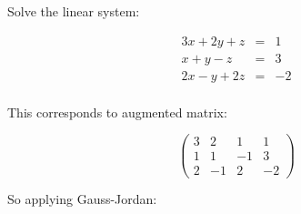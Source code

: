 \begin{example}\label{Example:GaussJordan}
Solve the linear system:

\begin{eqnarray*}
3x+2y+z&=&1\\
x+y-z&=&3\\
2x-y+2z&=&-2\\
\end{eqnarray*}

This corresponds to augmented matrix:


$$\left( \begin{array}{rrr|r}
3 & 2 & 1 & 1\\
1 & 1  & -1 & 3\\
2 & -1 & 2 & -2
\end{array}\right)$$

So applying Gauss-Jordan:


\end{example}
